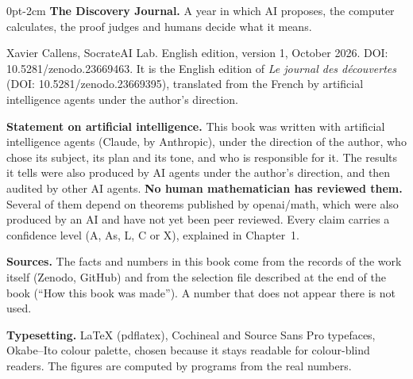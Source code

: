 \thispagestyle{empty}
\vspace*{\fill}
\begin{adjustwidth}{0pt}{-2cm}
\small
\noindent\textbf{The Discovery Journal.} A year in which AI proposes, the computer calculates, the proof judges and
humans decide what it means.\par\medskip
\noindent Xavier Callens, SocrateAI Lab. English edition, version 1, October 2026. DOI: 10.5281/zenodo.23669463. It is the English edition of \textit{Le journal des découvertes} (DOI: 10.5281/zenodo.23669395), translated from the French by artificial
intelligence agents under the author's direction.\par\medskip
\noindent\textbf{Statement on artificial intelligence.} This book was written with artificial intelligence agents
(Claude, by Anthropic), under the direction of the author, who chose its subject, its plan and its tone, and who is
responsible for it. The results it tells were also produced by AI agents under the author's direction, and then
audited by other AI agents. \textbf{No human mathematician has reviewed them.} Several of them depend on theorems
published by openai/math, which were also produced by an AI and have not yet been peer reviewed. Every claim carries
a confidence level (A, As, L, C or X), explained in Chapter~1.\par\medskip
\noindent\textbf{Sources.} The facts and numbers in this book come from the records of the work itself
(Zenodo, GitHub) and from the selection file described at the end of the book (``How this book was made''). A number
that does not appear there is not used.\par\medskip
\noindent\textbf{Typesetting.} \LaTeX{} (pdflatex), Cochineal and Source Sans Pro typefaces, Okabe--Ito colour
palette, chosen because it stays readable for colour-blind readers. The figures are computed by programs from the
real numbers.
\end{adjustwidth}
\vspace*{1.5cm}
\clearpage
